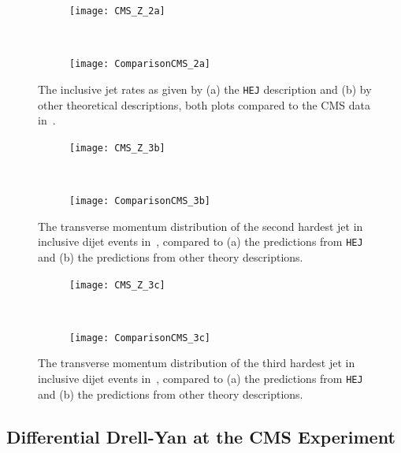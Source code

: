 		\begin{figure}[H]
		  \centering
		  \begin{subfigure}[b]{0.46\textwidth}
		    \texttt{[image: CMS\_Z\_2a]}
		    \caption{}
		    \label{fig:HEJ_CMS_2a}
		  \end{subfigure}
		  ~
		  \begin{subfigure}[b]{0.48\textwidth}
		    \texttt{[image: ComparisonCMS\_2a]}
		    \caption{}
		    \label{fig:MC_CMS_2a}
		  \end{subfigure}
		  \caption{The inclusive jet rates as given by (a) the \texttt{HEJ} description and (b)
		    by other theoretical descriptions, both plots compared to the CMS data in~\cite{Khachatryan:2014zya}.}
		  \label{fig:CMS_2a}

		  \begin{subfigure}[b]{0.46\textwidth}
		    \texttt{[image: CMS\_Z\_3b]}
		    \caption{}
		    \label{fig:HEJ_CMS_7b}
		  \end{subfigure}
		  ~
		  \begin{subfigure}[b]{0.48\textwidth}
		    \texttt{[image: ComparisonCMS\_3b]}
		    \caption{}
		    \label{fig:MC_CMS_7b}
		  \end{subfigure}
		  \caption{The transverse momentum distribution of the second hardest jet in
		    inclusive dijet events in~\cite{Khachatryan:2014zya}, compared to (a) the
		    predictions from \texttt{HEJ} and (b) the predictions from other theory descriptions.}
		  \label{fig:CMS_3b}
		\end{figure}

		\begin{figure}[H]
		  \centering
		  \begin{subfigure}[b]{0.46\textwidth}
		    \texttt{[image: CMS\_Z\_3c]}
		    \caption{}
		    \label{fig:HEJ_CMS_7b}
		  \end{subfigure}
		  ~
		  \begin{subfigure}[b]{0.48\textwidth}
		    \texttt{[image: ComparisonCMS\_3c]}
		    \caption{}
		    \label{fig:MC_CMS_7b}
		  \end{subfigure}
		  \caption{The transverse momentum distribution of the third hardest jet in
		    inclusive dijet events in~\cite{Khachatryan:2014zya}, compared to (a) the
		    predictions from \texttt{HEJ} and (b) the predictions from other theory descriptions.}
		  \label{fig:CMS_3c}
		\end{figure}

	\subsection{Differential Drell-Yan at the CMS Experiment}
		\label{sub:CMS2}

